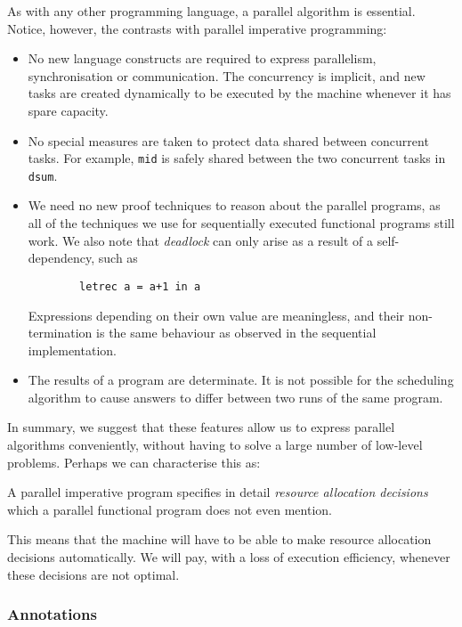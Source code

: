 As with any other programming language, a parallel algorithm is
essential.  Notice, however, the contrasts with parallel imperative
programming:
\begin{itemize}

\item No new language constructs are required to express parallelism,
synchronisation or communication. The concurrency is implicit, and new
tasks are created dynamically to be executed by the machine whenever
it has spare capacity.

\item No special measures are taken to protect data shared between
concurrent tasks. For example, \mbox{\tt mid} is safely shared between the two
concurrent tasks in \mbox{\tt dsum}.

\item We need no new proof techniques to reason about the parallel
programs, as all of the techniques we use for sequentially executed
functional programs still work. We also note that {\em
deadlock\/} can only arise as a result of
a self-dependency, such as
\begin{verbatim}
        letrec a = a+1 in a
\end{verbatim}
Expressions depending on their own value are meaningless, and their
non-termination is the same behaviour as observed in the sequential
implementation.

\item The results of a program are determinate. It is not possible for
the scheduling algorithm to cause answers to differ between two runs
of the same program.

\end{itemize}

In summary, we suggest that these features allow us to
express parallel algorithms conveniently,
without having to solve a large number of
low-level problems. Perhaps we can characterise this as:
\begin{important}
A parallel imperative program specifies in detail {\em
resource allocation decisions\/}
which a parallel functional program does not even mention.
\end{important}
This means that the machine will have to be able to make resource
allocation decisions automatically.  We will pay, with a loss of
execution efficiency, whenever these decisions are not optimal.

\subsubsection{Annotations}

